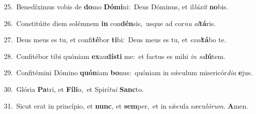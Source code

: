{\numbfont\textcolor{\numbcolor}{25.}}~Benedíximus vobis de \textbf{do}\-mo \textbf{Dó}\-\textbf{mi}ni:~\star Deus Dóminus, et il\-\textit{lú}\-\textit{xit} \textbf{no}\-bis.\par
{\numbfont\textcolor{\numbcolor}{26.}}~Constitúite diem solémnem \textbf{in} con\-\textbf{dén}\-sis,~\star usque ad cor\textit{nu} \textit{al}\-\textbf{tá}ris.\par
{\numbfont\textcolor{\numbcolor}{27.}}~Deus meus es tu, et confi\-\textbf{té}\-bor \textbf{ti}\-bi:~\star Deus meus es tu, et \textit{ex}\-\textit{al}\textbf{tá}bo te.\par
{\numbfont\textcolor{\numbcolor}{28.}}~Confitébor tibi quóniam \textbf{ex}\-au\-\textbf{dís}\-\textbf{ti} me:~\star et factus es mihi \textit{in} \textit{sa}\-\textbf{lú}tem.\par
{\numbfont\textcolor{\numbcolor}{29.}}~Confitémini Dómino \textbf{quón}\-iam \textbf{bo}\-nus:~\star quóniam in sǽculum misericór\-\textit{di}\-\textit{a} \textbf{e}\-jus.\par
{\numbfont\textcolor{\numbcolor}{30.}}~Glória \textbf{Pa}\-tri, et \textbf{Fí}\-\textbf{li}o,~\star et Spirí\-\textit{tu}\-\textit{i} \textbf{Sanc}\-to.\par
{\numbfont\textcolor{\numbcolor}{31.}}~Sicut erat in princípio, et \textbf{nunc}\-, et \textbf{sem}\-per,~\star et in sǽcula sæcu\-\textit{ló}\-\textit{rum}. \textbf{A}\-men.\par
